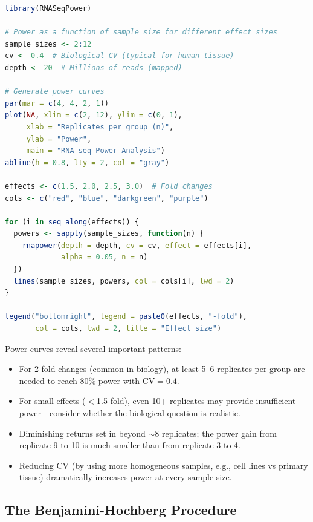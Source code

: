 \begin{lstlisting}[language=R,caption={Formal power analysis with power curves.},label=lst:power-curves]
library(RNASeqPower)

# Power as a function of sample size for different effect sizes
sample_sizes <- 2:12
cv <- 0.4  # Biological CV (typical for human tissue)
depth <- 20  # Millions of reads (mapped)

# Generate power curves
par(mar = c(4, 4, 2, 1))
plot(NA, xlim = c(2, 12), ylim = c(0, 1),
     xlab = "Replicates per group (n)",
     ylab = "Power",
     main = "RNA-seq Power Analysis")
abline(h = 0.8, lty = 2, col = "gray")

effects <- c(1.5, 2.0, 2.5, 3.0)  # Fold changes
cols <- c("red", "blue", "darkgreen", "purple")

for (i in seq_along(effects)) {
  powers <- sapply(sample_sizes, function(n) {
    rnapower(depth = depth, cv = cv, effect = effects[i],
             alpha = 0.05, n = n)
  })
  lines(sample_sizes, powers, col = cols[i], lwd = 2)
}

legend("bottomright", legend = paste0(effects, "-fold"),
       col = cols, lwd = 2, title = "Effect size")
\end{lstlisting}

\begin{keyconcept}[title={Interpreting Power Curves}]
Power curves reveal several important patterns:
\begin{itemize}[nosep]
  \item For 2-fold changes (common in biology), at least 5--6 replicates per group are needed to reach 80\% power with $\text{CV} = 0.4$.
  \item For small effects ($<$1.5-fold), even 10+ replicates may provide insufficient power---consider whether the biological question is realistic.
  \item Diminishing returns set in beyond $\sim$8 replicates; the power gain from replicate 9 to 10 is much smaller than from replicate 3 to 4.
  \item Reducing CV (by using more homogeneous samples, e.g., cell lines vs primary tissue) dramatically increases power at every sample size.
\end{itemize}
\end{keyconcept}

\subsection{The Benjamini-Hochberg Procedure}
\label{subsec:expdesign:bh}

